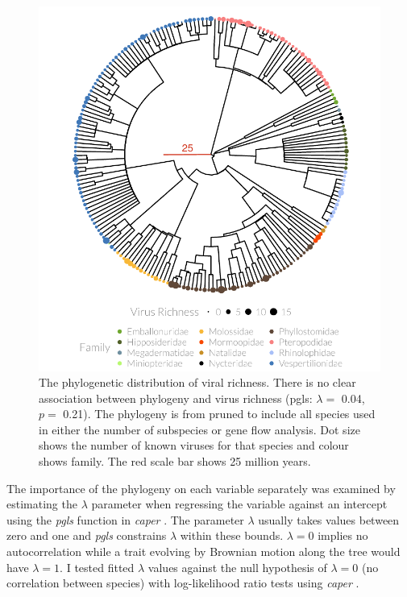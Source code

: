 \begin{knitrout}\footnotesize
{}\color{fgcolor}\begin{figure}[t]

{\centering \includegraphics[width=1\textwidth,trim = 0cm 0cm 0cm 0cm]{figure/treePlot-1} 

}

\caption[Pruned phylogeny with dot size showing number of pathogens and colour showing family.]{
The phylogenetic distribution of viral richness.
There is no clear association between phylogeny and virus richness (pgls: $\lambda =$ 0.04, $p =$ 0.21).
The phylogeny is from \cite{bininda2007delayed} pruned to include all species used in either the number of subspecies or gene flow analysis.
Dot size shows the number of known viruses for that species and colour shows family.
The red scale bar shows 25 million years.}\label{fig:treePlot}
\end{figure}


\end{knitrout}



The importance of the phylogeny on each variable separately was examined by estimating the $\lambda$ parameter when regressing the variable against an intercept using the \emph{pgls} function in \emph{caper} \cite{caper}.
The parameter $\lambda$ usually takes values between zero and one and \emph{pgls} constrains $\lambda$ within these bounds. 
$\lambda = 0$ implies no autocorrelation while a trait evolving by Brownian motion along the tree would have $\lambda = 1$.
I tested fitted $\lambda$ values against the null hypothesis of $\lambda = 0$ (no correlation between species) with log-likelihood ratio tests using \emph{caper} \cite{caper}.

